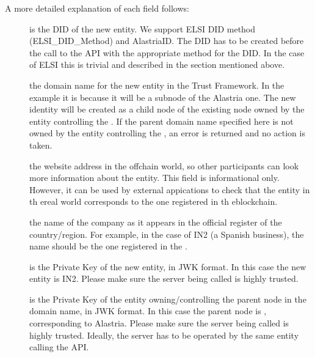 \documentclass[a4paper,12pt,english]{sphinxhowto}
\begin{document}
\sphinxAtStartPar
A more detailed explanation of each field follows:
\begin{description}
\item[{}] \leavevmode
\sphinxAtStartPar
is the DID of the new entity. We support ELSI DID method (ELSI\_DID\_Method) and AlastriaID. The DID has to be created before the call to the API with the appropriate method for the DID. In the case of ELSI this is trivial and described in the section mentioned above.

\item[{}] \leavevmode
\sphinxAtStartPar
the domain name for the new entity in the Trust Framework. In the example it is  because it will be a sub\sphinxhyphen{}node of the Alastria one. The new identity will be created as a child node of the existing node owned by the entity controlling the . If the parent domain name specified here is not owned by the entity controlling the , an error is returned and no action is taken.

\item[{}] \leavevmode
\sphinxAtStartPar
the website address in the off\sphinxhyphen{}chain world, so other participants can look more information about the entity. This field is informational only. However, it can be used by external appications to check that the entity in th ereal world corresponds to the one registered in th eblockchain.

\item[{}] \leavevmode
\sphinxAtStartPar
the name of the company as it appears in the official register of the country/region. For example, in the case of IN2 (a Spanish business), the name should be the one registered in the .

\item[{}] \leavevmode
\sphinxAtStartPar
is the Private Key of the new entity, in JWK format. In this case the new entity is IN2. Please make sure the server being called is highly trusted.

\item[{}] \leavevmode
\sphinxAtStartPar
is the Private Key of the entity owning/controlling the parent node in the domain name, in JWK format. In this case the parent node is , corresponding to Alastria. Please make sure the server being called is highly trusted. Ideally, the server has to be operated by the same entity calling the API.

\end{description}
\end{document}
